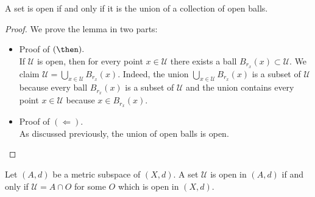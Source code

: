 \documentclass[12pt, a4paper]{article}
\begin{document}
\begin{lemma}
    A set is open if and only if it is the union of a collection of open balls.
\end{lemma}

\begin{proof}
    We prove the lemma in two parts:
    \begin{itemize}
        \item Proof of \((\then).\) \\
        If \(\mathcal{U}\) is open, then for every point \(x \in \mathcal{U}\) there exists a ball \(B_{r_x}(x) \subset \mathcal{U}\). We claim \(\mathcal{U} = \bigcup_{x \in \mathcal{U}} B_{r_x}(x)\). Indeed, the union \(\bigcup_{x \in \mathcal{U}} B_{r_x}(x)\) is a subset of \(\mathcal{U}\) because every ball \(B_{r_x}(x)\) is a subset of \(\mathcal{U}\) and the union contains every point \(x \in \mathcal{U}\) because \(x \in B_{r_x}(x)\).
        \item Proof of \((\Leftarrow)\). \\
        As discussed previously, the union of open balls is open.
    \end{itemize}
\end{proof}

\begin{mdprop}
    Let \((A,d)\) be a metric subspace of \((X,d)\). A set \(\mathcal{U}\) is open in \((A,d)\) if and only if \(\mathcal{U}=A \cap O\) for some \(O\) which is open in \((X,d)\).
\end{mdprop}
\end{document}
